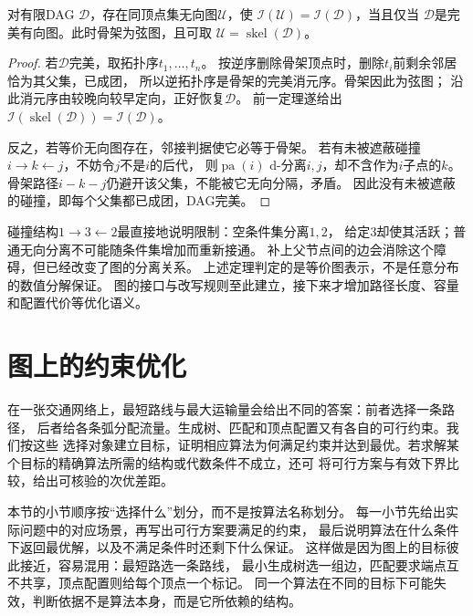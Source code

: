 \begin{theorem}[有向图的完美无向图表示]
  \label{thm:graph-theory-perfect-undirected}
  对有限DAG \(\mathcal D\)，存在同顶点集无向图\(\mathcal U\)，使
  \(\mathcal I(\mathcal U)=\mathcal I(\mathcal D)\)，当且仅当
  \(\mathcal D\)是完美有向图。此时骨架为弦图，且可取
  \(\mathcal U=\operatorname{skel}(\mathcal D)\)。
\end{theorem}

\begin{proof}
若\(\mathcal D\)完美，取拓扑序\(t_1,\ldots,t_n\)。
按逆序删除骨架顶点时，删除\(t_i\)前剩余邻居恰为其父集，已成团，
所以逆拓扑序是骨架的完美消元序。骨架因此为弦图；
沿此消元序由较晚向较早定向，正好恢复\(\mathcal D\)。
前一定理遂给出
\(\mathcal I(\operatorname{skel}(\mathcal D))=\mathcal I(\mathcal D)\)。

反之，若等价无向图存在，邻接判据使它必等于骨架。
若有未被遮蔽碰撞\(i\to k\leftarrow j\)，不妨令\(j\)不是\(i\)的后代，
则\(\operatorname{pa}(i)\) d-分离\(i,j\)，却不含作为\(i\)子点的\(k\)。
骨架路径\(i-k-j\)仍避开该父集，不能被它无向分隔，矛盾。
因此没有未被遮蔽的碰撞，即每个父集都已成团，DAG完美。
\end{proof}

碰撞结构\(1\to3\leftarrow2\)最直接地说明限制：空条件集分离\(1,2\)，
给定\(3\)却使其活跃；普通无向分离不可能随条件集增加而重新接通。
补上父节点间的边会消除这个障碍，但已经改变了图的分离关系。
上述定理判定的是等价图表示，不是任意分布的数值分解保证。
图的接口与改写规则至此建立，接下来才增加路径长度、容量和配置代价等优化语义。

\section{图上的约束优化}
\label{sec:graph-theory-exact-approximate-algorithms}

在一张交通网络上，最短路线与最大运输量会给出不同的答案：前者选择一条路径，
后者给各条弧分配流量。生成树、匹配和顶点配置又有各自的可行约束。我们按这些
选择对象建立目标，证明相应算法为何满足约束并达到最优。若求解某个目标的精确算法所需的结构或代数条件不成立，还可
将可行方案与有效下界比较，给出可核验的次优差距。

本节的小节顺序按“选择什么”划分，而不是按算法名称划分。
每一小节先给出实际问题中的对应场景，再写出可行方案要满足的约束，
最后说明算法在什么条件下返回最优解，以及不满足条件时还剩下什么保证。
这样做是因为图上的目标彼此接近，容易混用：最短路选一条路线，
最小生成树选一组边，匹配要求端点互不共享，顶点配置则给每个顶点一个标记。
同一个算法在不同的目标下可能失效，判断依据不是算法本身，而是它所依赖的结构。

